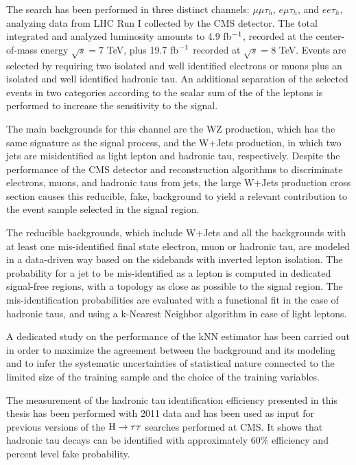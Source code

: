 The search has been performed in three distinct channels: $\mu\mu\tau_h$, $e\mu\tau_h$, and $ee\tau_h$, analyzing data from LHC Run I collected by the CMS detector. The total integrated and analyzed luminosity amounts to 4.9 fb$^{-1}$, recorded at the center-of-mass energy $\sqrt{s} = 7$ TeV, plus 19.7 fb$^{-1}$ recorded at $\sqrt{s} = 8$ TeV. Events are selected by requiring two isolated and well identified electrons or muons plus an isolated and well identified hadronic tau. An additional separation of the selected events in two categories according to the scalar sum of the \pT of the leptons is performed to increase %
the sensitivity to the signal. 

The main backgrounds for this channel are the WZ production, which has the same signature as the signal process, and the W+Jets production, in which two jets are misidentified as light lepton and hadronic tau, respectively. 
Despite the performance of the CMS detector and reconstruction algorithms to discriminate electrons, muons, and hadronic taus from jets, the large W+Jets production cross section causes this reducible, fake, background to yield a relevant contribution to the event sample selected in the signal region.

The reducible backgrounds, which include W+Jets and all the backgrounds with at least one mis-identified final state electron, muon or hadronic tau, are modeled in a data-driven way based on the  sidebands with inverted lepton isolation. The probability for a jet to be mis-identified as a lepton is computed in dedicated signal-free regions, with a topology as close as possible to the signal region. The mis-identification probabilities are evaluated with a functional fit in the case of hadronic taus, and using a k-Nearest Neighbor algorithm in case of light leptons. 

A dedicated study on the performance of the kNN estimator has been carried out in order to maximize the agreement between the background and its modeling and to infer the systematic uncertainties of statistical nature connected to the limited size of the training sample and the choice of the training variables.

The measurement of the hadronic tau identification efficiency presented in this thesis has been performed with 2011 data and has been used as input for previous versions of the $\mathrm{H} \rightarrow \tau \tau$ searches performed at CMS. It shows that hadronic tau decays can be identified with approximately 60\% efficiency and percent level fake probability.

